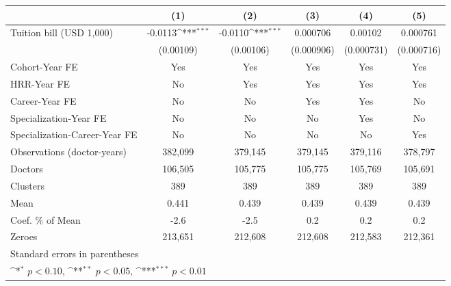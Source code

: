 {
\def\sym#1{\ifmmode^{#1}\else\(^{#1}\)\fi}
\begin{tabular}{l*{5}{c}}
\hline\hline
                    &\multicolumn{1}{c}{(1)}         &\multicolumn{1}{c}{(2)}         &\multicolumn{1}{c}{(3)}         &\multicolumn{1}{c}{(4)}         &\multicolumn{1}{c}{(5)}         \\
\hline
Tuition bill (USD 1,000)&     -0.0113\sym{***}&     -0.0110\sym{***}&    0.000706         &     0.00102         &    0.000761         \\
                    &   (0.00109)         &   (0.00106)         &  (0.000906)         &  (0.000731)         &  (0.000716)         \\
[1em]
Cohort-Year FE      &         Yes         &         Yes         &         Yes         &         Yes         &         Yes         \\
[1em]
HRR-Year FE         &          No         &         Yes         &         Yes         &         Yes         &         Yes         \\
[1em]
Career-Year FE      &          No         &          No         &         Yes         &         Yes         &          No         \\
[1em]
Specialization-Year FE&          No         &          No         &          No         &         Yes         &          No         \\
[1em]
Specialization-Career-Year FE&          No         &          No         &          No         &          No         &         Yes         \\
\hline
Observations (doctor-years)&     382,099         &     379,145         &     379,145         &     379,116         &     378,797         \\
Doctors             &     106,505         &     105,775         &     105,775         &     105,769         &     105,691         \\
Clusters            &         389         &         389         &         389         &         389         &         389         \\
Mean                &       0.441         &       0.439         &       0.439         &       0.439         &       0.439         \\
Coef. \% of Mean    &        -2.6         &        -2.5         &         0.2         &         0.2         &         0.2         \\
Zeroes              &     213,651         &     212,608         &     212,608         &     212,583         &     212,361         \\
\hline\hline
\multicolumn{6}{l}{\footnotesize Standard errors in parentheses}\\
\multicolumn{6}{l}{\footnotesize \sym{*} \(p<0.10\), \sym{**} \(p<0.05\), \sym{***} \(p<0.01\)}\\
\end{tabular}
}
